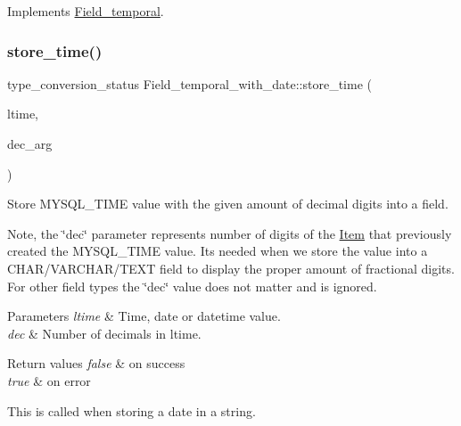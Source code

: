 Implements \mbox{\hyperlink{classField__temporal_ae2be4bf490d06f2f1707bee19dcbebf4}{Field\+\_\+temporal}}.

\mbox{\label{classField__temporal__with__date_aa93167bb62fc7b8e0428ef1e3baaaf7c}} 
\subsubsection{\texorpdfstring{store\+\_\+time()}{store\_time()}}
{\footnotesize\ttfamily type\+\_\+conversion\+\_\+status Field\+\_\+temporal\+\_\+with\+\_\+date\+::store\+\_\+time (\begin{DoxyParamCaption}\item[{M\+Y\+S\+Q\+L\+\_\+\+T\+I\+ME $\ast$}]{ltime,  }\item[{uint8}]{dec\+\_\+arg }\end{DoxyParamCaption})\hspace{0.3cm}{\ttfamily [virtual]}}

Store M\+Y\+S\+Q\+L\+\_\+\+T\+I\+ME value with the given amount of decimal digits into a field.

Note, the \char`\"{}dec\char`\"{} parameter represents number of digits of the \mbox{\hyperlink{classItem}{Item}} that previously created the M\+Y\+S\+Q\+L\+\_\+\+T\+I\+ME value. It\textquotesingle{}s needed when we store the value into a C\+H\+A\+R/\+V\+A\+R\+C\+H\+A\+R/\+T\+E\+XT field to display the proper amount of fractional digits. For other field types the \char`\"{}dec\char`\"{} value does not matter and is ignored.


\begin{DoxyParams}{Parameters}
{\em ltime} & Time, date or datetime value. \\
\hline
{\em dec} & Number of decimals in ltime. \\
\hline
\end{DoxyParams}

\begin{DoxyRetVals}{Return values}
{\em false} & on success \\
\hline
{\em true} & on error\\
\hline
\end{DoxyRetVals}
This is called when storing a date in a string.

